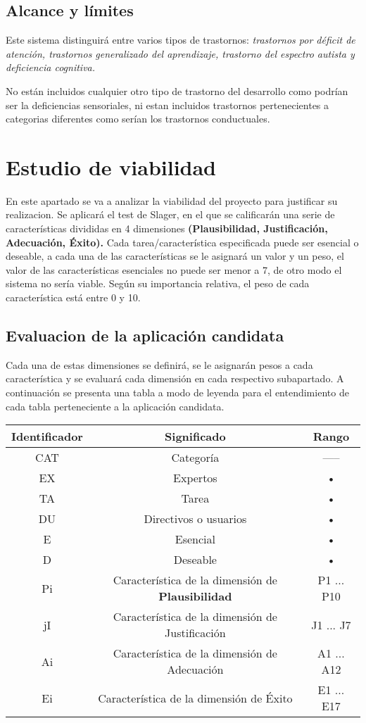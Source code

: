 \documentclass[letterpaper,12pt]{article}
\begin{document}
	\subsection{Alcance y límites}
	Este sistema distinguirá entre varios tipos de trastornos: \textit{trastornos por déficit de atención, trastornos generalizado del aprendizaje, trastorno del espectro autista y deficiencia cognitiva.}
	
	No están incluidos cualquier otro tipo de trastorno del desarrollo como podrían ser la deficiencias sensoriales, ni estan incluidos trastornos pertenecientes a categorias diferentes como serían los trastornos conductuales.
	
	\section{Estudio de viabilidad}
	En este apartado se va a analizar la viabilidad del proyecto para justificar su realizacion. Se aplicará el test de Slager, en el que se calificarán una serie de características divididas en 4 dimensiones \textbf{(Plausibilidad, Justificación, Adecuación,
Éxito).} Cada tarea/característica especificada puede ser esencial o deseable, a cada una de las características se le asignará un valor y un peso, el valor de las características esenciales no puede ser menor a 7, de otro modo el sistema no sería viable. Según su importancia relativa, el peso de cada característica está entre 0 y 10.
	\subsection{Evaluacion de la aplicación candidata}
	Cada una de estas dimensiones se definirá, se le asignarán pesos a cada característica y se evaluará cada dimensión en cada respectivo subapartado.
A continuación se presenta una tabla a modo de leyenda para el entendimiento de cada tabla perteneciente a la aplicación candidata.

\begin{tabular}{|c|c|c|}
\hline 
Identificador & Significado & Rango \\ 
\hline
CAT & Categoría & ----- \\ 
\hline 
EX & Expertos & • \\ 
\hline 
TA & Tarea & • \\ 
\hline 
DU & Directivos o usuarios & • \\ 
\hline 
E & Esencial & • \\ 
\hline 
D & Deseable & • \\ 
\hline 
Pi & Característica de la dimensión de \textbf{Plausibilidad} & P1 ... P10 \\ 
\hline 
jI & Característica de la dimensión de Justificación & J1 ... J7 \\ 
\hline 
Ai & Característica de la dimensión de Adecuación & A1 ... A12 \\ 
\hline 
Ei & Característica de la dimensión de Éxito & E1 ... E17 \\ 
\hline 
\end{tabular} \\
\end{document}
